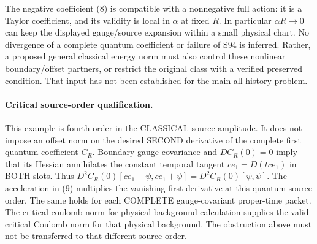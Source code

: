 \documentclass[11pt]{article}
\begin{document}
The negative coefficient (8) is compatible with a nonnegative full
action: it is a Taylor coefficient, and its validity is local in
$\alpha$ at fixed $R$. In particular $\alpha R\to0$ can keep the
displayed gauge/source expansion within a small physical chart.
No divergence of a complete quantum coefficient or failure of S94
is inferred. Rather, a proposed general classical energy norm must
also control these nonlinear boundary/offset partners, or restrict
the original class with a verified preserved condition. That input
has not been established for the main all-history problem.
\paragraph{Critical source-order qualification.}
This example is fourth order in the CLASSICAL source amplitude.
It does not impose an offset norm on the desired SECOND derivative
of the complete first quantum coefficient $C_R$. Boundary gauge
covariance and $DC_R(0)=0$ imply that its Hessian annihilates the
constant temporal tangent $c e_1=D(t c e_1)$ in BOTH slots. Thus
$D^2C_R(0)[c e_1+\psi,c e_1+\psi]=D^2C_R(0)[\psi,\psi]$.
The acceleration in (9) multiplies the vanishing first derivative
at this quantum source order. The same holds for each COMPLETE
gauge-covariant proper-time packet. The critical coulomb norm for physical background calculation supplies the valid
critical Coulomb norm for that physical background. The obstruction
above must not be transferred to that different source order.
\end{document}
